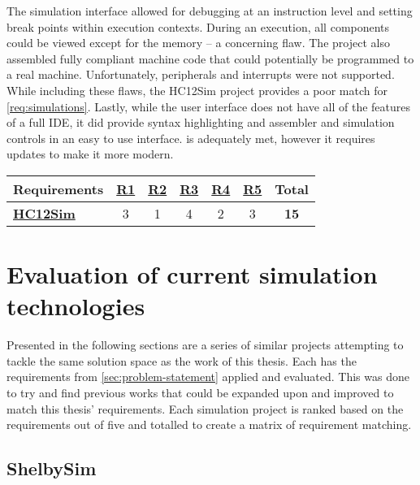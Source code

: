 The simulation interface allowed for debugging at an instruction level and setting break points within execution contexts. During an execution, all components could be viewed except for the memory -- a concerning flaw. The project also assembled fully compliant machine code that could potentially be programmed to a real machine. Unfortunately, peripherals and interrupts were not supported. While including these flaws, the HC12Sim project provides a poor match for \cref{req:simulations}. Lastly, while the user interface does not have all of the features of a full IDE, it did provide syntax highlighting and assembler and simulation controls in an easy to use interface.  is adequately met, however it requires updates to make it more modern.

\begin{table}[h!]
    \centering
    \begin{tabular}{l|cccccc}
        \textbf{Requirements} & \textbf{\hyperref[req:personal]{R1}} & \textbf{\hyperref[req:configuration]{R2}} & \textbf{\hyperref[req:pedagogical]{R3}} & \textbf{\hyperref[req:simulations]{R4}} & \textbf{\hyperref[req:modern]{R5}} & \textbf{Total} \\ \hline
        \textbf{\hyperref[sec:review-prev-hc12sim]{HC12Sim} \cite{Brightwell2013}} 
        & 3 & 1 & 4 & 2 & 3 & \textbf{15} \\
    \end{tabular}
\end{table}



\section{Evaluation of current simulation technologies} 
\label{sec:review}

Presented in the following sections are a series of similar projects attempting to tackle the same solution space as the work of this thesis. Each has the requirements from \cref{sec:problem-statement} applied and evaluated. This was done to try and find previous works that could be expanded upon and improved to match this thesis' requirements. Each simulation project is ranked based on the requirements out of five and totalled to create a matrix of requirement matching.

\subsection{ShelbySim}
\label{sec:review-shelbysim}

